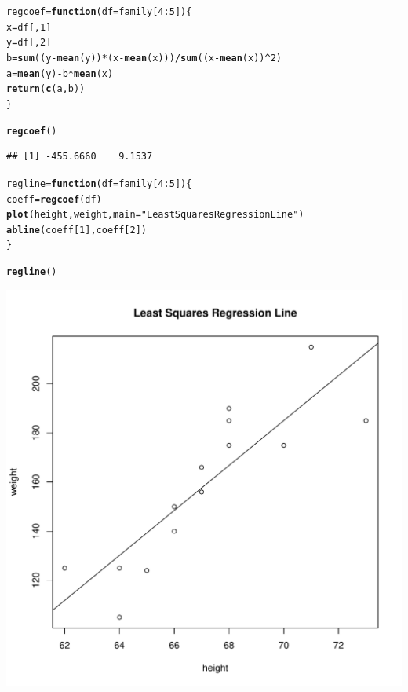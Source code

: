 \documentclass[11pt]{article}\usepackage[]{graphicx}\usepackage[]{color}
\makeatletter
\def\maxwidth{ %
  \ifdim\Gin@nat@width>\linewidth
    \linewidth
  \else
    \Gin@nat@width
  \fi
}
\newcommand{\hlnum}[1]{\textcolor[rgb]{0.686,0.059,0.569}{#1}}%
\newcommand{\hlstr}[1]{\textcolor[rgb]{0.192,0.494,0.8}{#1}}%
\newcommand{\hlopt}[1]{\textcolor[rgb]{0,0,0}{#1}}%
\newcommand{\hlstd}[1]{\textcolor[rgb]{0.345,0.345,0.345}{#1}}%
\newcommand{\hlkwa}[1]{\textcolor[rgb]{0.161,0.373,0.58}{\textbf{#1}}}%
\newcommand{\hlkwb}[1]{\textcolor[rgb]{0.69,0.353,0.396}{#1}}%
\newcommand{\hlkwc}[1]{\textcolor[rgb]{0.333,0.667,0.333}{#1}}%
\newcommand{\hlkwd}[1]{\textcolor[rgb]{0.737,0.353,0.396}{\textbf{#1}}}%
\newenvironment{kframe}{%
 \def\at@end@of@kframe{}%
 \ifinner\ifhmode%
  \def\at@end@of@kframe{\end{minipage}}%
  \begin{minipage}{\columnwidth}%
 \fi\fi%
 \def\FrameCommand##1{\hskip\@totalleftmargin \hskip-\fboxsep
 \colorbox{shadecolor}{##1}\hskip-\fboxsep
     \hskip-\linewidth \hskip-\@totalleftmargin \hskip\columnwidth}%
 \MakeFramed {\advance\hsize-\width
   \@totalleftmargin\z@ \linewidth\hsize
   \@setminipage}}%
 {\par\unskip\endMakeFramed%
 \at@end@of@kframe}
\newenvironment{knitrout}{}{} %
\makeatother
\begin{document}
\begin{knitrout}
\color{fgcolor}\begin{kframe}
\begin{alltt}
\hlstd{regcoef} \hlkwb{=} \hlkwa{function}\hlstd{(}\hlkwc{df}\hlstd{=family[}\hlnum{4}\hlopt{:}\hlnum{5}\hlstd{])\{}
  \hlstd{x} \hlkwb{=} \hlstd{df[,}\hlnum{1}\hlstd{]}
  \hlstd{y} \hlkwb{=} \hlstd{df[,}\hlnum{2}\hlstd{]}
  \hlstd{b} \hlkwb{=} \hlkwd{sum}\hlstd{((y}\hlopt{-}\hlkwd{mean}\hlstd{(y))}\hlopt{*}\hlstd{(x}\hlopt{-}\hlkwd{mean}\hlstd{(x)))}\hlopt{/}\hlkwd{sum}\hlstd{((x}\hlopt{-}\hlkwd{mean}\hlstd{(x))}\hlopt{^}\hlnum{2}\hlstd{)}
  \hlstd{a} \hlkwb{=} \hlkwd{mean}\hlstd{(y)} \hlopt{-} \hlstd{b}\hlopt{*}\hlkwd{mean}\hlstd{(x)}
  \hlkwd{return}\hlstd{(}\hlkwd{c}\hlstd{(a,b))}
\hlstd{\}}

\hlkwd{regcoef}\hlstd{()}
\end{alltt}
\begin{verbatim}
## [1] -455.6660    9.1537
\end{verbatim}
\end{kframe}
\end{knitrout}


\begin{knitrout}
\color{fgcolor}\begin{kframe}
\begin{alltt}
\hlstd{regline} \hlkwb{=} \hlkwa{function}\hlstd{(}\hlkwc{df}\hlstd{=family[}\hlnum{4}\hlopt{:}\hlnum{5}\hlstd{])\{}
  \hlstd{coeff} \hlkwb{=} \hlkwd{regcoef}\hlstd{(df)}
  \hlkwd{plot}\hlstd{(height,weight,} \hlkwc{main} \hlstd{=} \hlstr{"Least Squares Regression Line"}\hlstd{)}
  \hlkwd{abline}\hlstd{(coeff[}\hlnum{1}\hlstd{],coeff[}\hlnum{2}\hlstd{])}
\hlstd{\}}

\hlkwd{regline}\hlstd{()}
\end{alltt}
\end{kframe}
\includegraphics[width=\maxwidth]{figure/unnamed-chunk-4-1} 

\end{knitrout}
\end{document}
